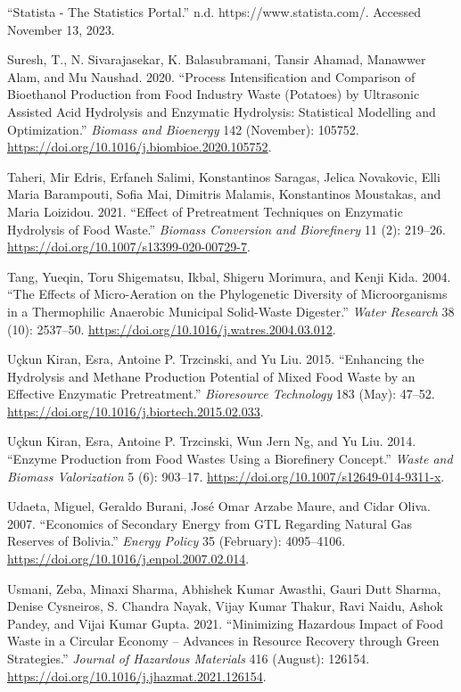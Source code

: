 \documentclass[11pt]{report}
\begin{document}
\begin{hangparas}{1.5em}{1}
\hypertarget{citeproc_bib_item_37}{“Statista - The Statistics Portal.” n.d. https://www.statista.com/. Accessed November 13, 2023.}

\hypertarget{citeproc_bib_item_38}{Suresh, T., N. Sivarajasekar, K. Balasubramani, Tansir Ahamad, Manawwer Alam, and Mu Naushad. 2020. “Process Intensification and Comparison of Bioethanol Production from Food Industry Waste (Potatoes) by Ultrasonic Assisted Acid Hydrolysis and Enzymatic Hydrolysis: Statistical Modelling and Optimization.” \textit{Biomass and Bioenergy} 142 (November): 105752. \url{https://doi.org/10.1016/j.biombioe.2020.105752}.}

\hypertarget{citeproc_bib_item_39}{Taheri, Mir Edris, Erfaneh Salimi, Konstantinos Saragas, Jelica Novakovic, Elli Maria Barampouti, Sofia Mai, Dimitris Malamis, Konstantinos Moustakas, and Maria Loizidou. 2021. “Effect of Pretreatment Techniques on Enzymatic Hydrolysis of Food Waste.” \textit{Biomass Conversion and Biorefinery} 11 (2): 219–26. \url{https://doi.org/10.1007/s13399-020-00729-7}.}

\hypertarget{citeproc_bib_item_40}{Tang, Yueqin, Toru Shigematsu, Ikbal, Shigeru Morimura, and Kenji Kida. 2004. “The Effects of Micro-Aeration on the Phylogenetic Diversity of Microorganisms in a Thermophilic Anaerobic Municipal Solid-Waste Digester.” \textit{Water Research} 38 (10): 2537–50. \url{https://doi.org/10.1016/j.watres.2004.03.012}.}

\hypertarget{citeproc_bib_item_41}{Uçkun Kiran, Esra, Antoine P. Trzcinski, and Yu Liu. 2015. “Enhancing the Hydrolysis and Methane Production Potential of Mixed Food Waste by an Effective Enzymatic Pretreatment.” \textit{Bioresource Technology} 183 (May): 47–52. \url{https://doi.org/10.1016/j.biortech.2015.02.033}.}

\hypertarget{citeproc_bib_item_42}{Uçkun Kiran, Esra, Antoine P. Trzcinski, Wun Jern Ng, and Yu Liu. 2014. “Enzyme Production from Food Wastes Using a Biorefinery Concept.” \textit{Waste and Biomass Valorization} 5 (6): 903–17. \url{https://doi.org/10.1007/s12649-014-9311-x}.}

\hypertarget{citeproc_bib_item_43}{Udaeta, Miguel, Geraldo Burani, José Omar Arzabe Maure, and Cidar Oliva. 2007. “Economics of Secondary Energy from GTL Regarding Natural Gas Reserves of Bolivia.” \textit{Energy Policy} 35 (February): 4095–4106. \url{https://doi.org/10.1016/j.enpol.2007.02.014}.}

\hypertarget{citeproc_bib_item_44}{Usmani, Zeba, Minaxi Sharma, Abhishek Kumar Awasthi, Gauri Dutt Sharma, Denise Cysneiros, S. Chandra Nayak, Vijay Kumar Thakur, Ravi Naidu, Ashok Pandey, and Vijai Kumar Gupta. 2021. “Minimizing Hazardous Impact of Food Waste in a Circular Economy – Advances in Resource Recovery through Green Strategies.” \textit{Journal of Hazardous Materials} 416 (August): 126154. \url{https://doi.org/10.1016/j.jhazmat.2021.126154}.}


\end{hangparas}
\end{document}
